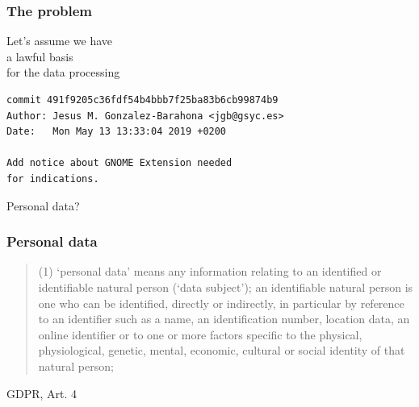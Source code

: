 \documentclass[17pt,aspectratio=169,hyperref={pdfusetitle,colorlinks,allcolors=olive}]{beamer}
\begin{document}
\begin{frame}[fragile]
  \frametitle{The problem}

  \begin{center}
  {\Large
    Let's assume we have \\
    a lawful basis \\
    for the data processing \\
  }
  \end{center}
\end{frame}


\begin{frame}[fragile]

{\small
\begin{verbatim}
commit 491f9205c36fdf54b4bbb7f25ba83b6cb99874b9
Author: Jesus M. Gonzalez-Barahona <jgb@gsyc.es>
Date:   Mon May 13 13:33:04 2019 +0200

Add notice about GNOME Extension needed
for indications.
\end{verbatim}  
}

\pause

\begin{center}
  {\Large
    Personal data?
  }
\end{center}

\end{frame}


\begin{frame}[fragile]
  \frametitle{Personal data}

  {\footnotesize
  \begin{quotation}
    (1) ‘personal data’ means any information relating to an identified or identifiable natural person (‘data subject’); an identifiable natural person is one who can be identified, directly or indirectly, in particular by reference to an identifier such as a name, an identification number, location data, an online identifier or to one or more factors specific to the physical, physiological, genetic, mental, economic, cultural or social identity of that natural person;
  \end{quotation}
  }
  
  \begin{flushright}
    GDPR, Art. 4
  \end{flushright}
\end{frame}
\end{document}
